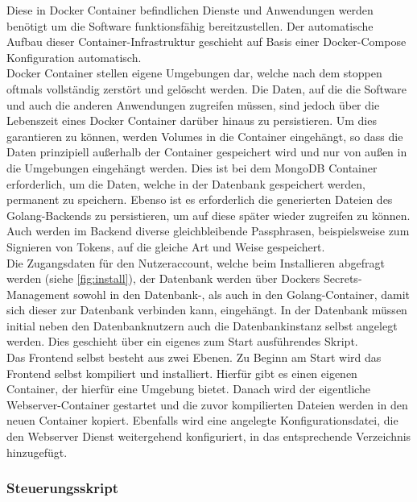 \newpage

Diese in Docker Container befindlichen Dienste und Anwendungen werden benötigt um die Software funktionsfähig bereitzustellen. Der automatische Aufbau dieser Container-Infrastruktur geschieht auf Basis einer Docker-Compose Konfiguration automatisch. \\

Docker Container stellen eigene Umgebungen dar, welche nach dem stoppen oftmals vollständig zerstört und gelöscht werden. Die Daten, auf die die Software und auch die anderen Anwendungen zugreifen müssen, sind jedoch über die Lebenszeit eines Docker Container darüber hinaus zu persistieren. Um dies garantieren zu können, werden Volumes in die Container eingehängt, so dass die Daten prinzipiell außerhalb der Container gespeichert wird und nur von außen in die Umgebungen eingehängt werden. Dies ist bei dem MongoDB Container erforderlich, um die Daten, welche in der Datenbank gespeichert werden, permanent zu speichern. Ebenso ist es erforderlich die generierten Dateien des Golang-Backends zu persistieren, um auf diese später wieder zugreifen zu können. Auch werden im Backend diverse gleichbleibende Passphrasen, beispielsweise zum Signieren von Tokens, auf die gleiche Art und Weise gespeichert. \\

Die Zugangsdaten für den Nutzeraccount, welche beim Installieren abgefragt werden (siehe \autoref{fig:install}), der Datenbank werden über Dockers Secrets-Management sowohl in den Datenbank-, als auch in den Golang-Container, damit sich dieser zur Datenbank verbinden kann, eingehängt. In der Datenbank müssen initial neben den Datenbanknutzern auch die Datenbankinstanz selbst angelegt werden. Dies geschieht über ein eigenes zum Start ausführendes Skript. \\

Das Frontend selbst besteht aus zwei Ebenen. Zu Beginn am Start wird das Frontend selbst kompiliert und installiert. Hierfür gibt es einen eigenen Container, der hierfür eine Umgebung bietet. Danach wird der eigentliche Webserver-Container gestartet und die zuvor kompilierten Dateien werden in den neuen Container kopiert. Ebenfalls wird eine angelegte Konfigurationsdatei, die den Webserver Dienst weitergehend konfiguriert, in das entsprechende Verzeichnis hinzugefügt.\\


\newpage

\subsubsection{Steuerungsskript}

